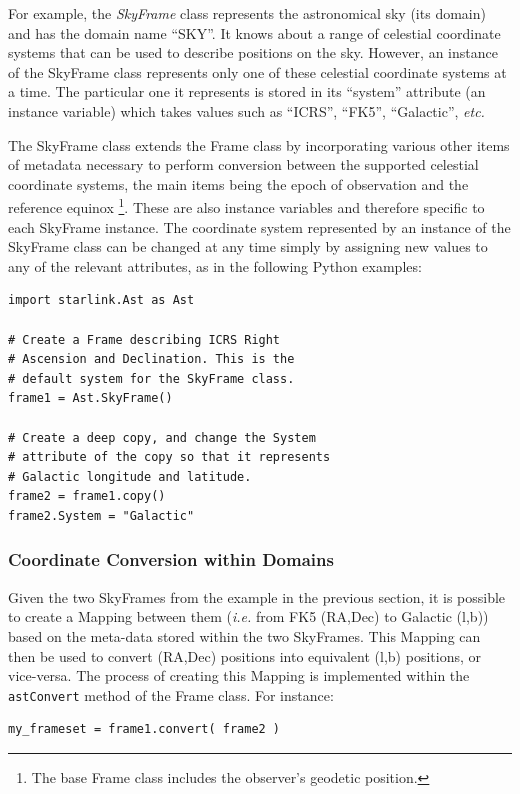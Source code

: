\documentclass[final,authoryear,5p,times,twocolumn]{elsarticle}
\begin{document}
For example, the \emph{SkyFrame} class represents the astronomical sky (its
domain) and has the domain name ``SKY''. It knows about a range of celestial
coordinate systems that can be used to describe positions on the sky.
However, an instance of the SkyFrame class represents only one of these
celestial coordinate systems at a time. The particular one it represents is
stored in its ``system'' attribute (an instance variable) which takes
values such as ``ICRS'', ``FK5'', ``Galactic'', \emph{etc.}

The SkyFrame class extends the Frame class by incorporating various other
items of metadata necessary to perform conversion between the supported
celestial coordinate systems, the main items being the epoch of observation
and the reference equinox \footnote{The base Frame class includes the
observer's geodetic position.}. These are also instance variables and
therefore specific to each SkyFrame instance. The coordinate system
represented by an instance of the SkyFrame class can be changed at any time
simply by assigning new values to any of the relevant attributes, as in
the following Python examples:

\begin{lstlisting}
import starlink.Ast as Ast

# Create a Frame describing ICRS Right
# Ascension and Declination. This is the
# default system for the SkyFrame class.
frame1 = Ast.SkyFrame()

# Create a deep copy, and change the System
# attribute of the copy so that it represents
# Galactic longitude and latitude.
frame2 = frame1.copy()
frame2.System = "Galactic"

\end{lstlisting}

\subsubsection{Coordinate Conversion within Domains}
\label{sec:domConversion}
Given the two SkyFrames from the example in the previous section, it is
possible to create a Mapping between them (\emph{i.e.} from FK5 (RA,Dec)
to Galactic (l,b)) based on the meta-data stored within the two
SkyFrames. This Mapping can then be used to convert (RA,Dec) positions
into equivalent (l,b) positions, or vice-versa. The process of creating
this Mapping is implemented within the \texttt{astConvert} method of the
Frame class. For instance:

\begin{lstlisting}
my_frameset = frame1.convert( frame2 )
\end{lstlisting}
\end{document}
